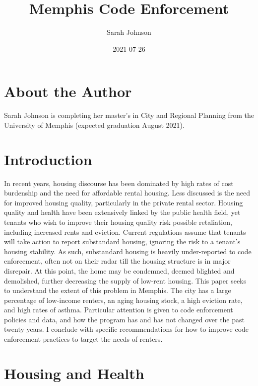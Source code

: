 \documentclass[
]{book}
\title{Memphis Code Enforcement}
\author{Sarah Johnson}
\date{2021-07-26}
\begin{document}
\maketitle

{
\setcounter{tocdepth}{1}
\tableofcontents
}
\hypertarget{about-the-author}{%
\chapter*{About the Author}\label{about-the-author}}

Sarah Johnson is completing her master's in City and Regional Planning from the University of Memphis (expected graduation August 2021).

\hypertarget{intro}{%
\chapter{Introduction}\label{intro}}

In recent years, housing discourse has been dominated by high rates of cost burdenship and the need for affordable rental housing. Less discussed is the need for improved housing quality, particularly in the private rental sector. Housing quality and health have been extensively linked by the public health field, yet tenants who wish to improve their housing quality risk possible retaliation, including increased rents and eviction. Current regulations assume that tenants will take action to report substandard housing, ignoring the risk to a tenant's housing stability. As such, substandard housing is heavily under-reported to code enforcement, often not on their radar till the housing structure is in major disrepair. At this point, the home may be condemned, deemed blighted and demolished, further decreasing the supply of low-rent housing. This paper seeks to understand the extent of this problem in Memphis. The city has a large percentage of low-income renters, an aging housing stock, a high eviction rate, and high rates of asthma. Particular attention is given to code enforcement policies and data, and how the program has and has not changed over the past twenty years. I conclude with specific recommendations for how to improve code enforcement practices to target the needs of renters.

\hypertarget{housing-and-health}{%
\chapter{Housing and Health}\label{housing-and-health}}
\end{document}

